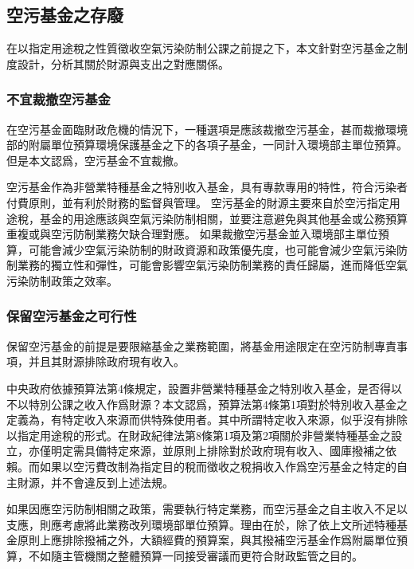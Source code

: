 \documentclass[12pt,a4paper]{article}
\begin{document}


\subsection{空污基金之存廢}

在以指定用途稅之性質徵收空氣污染防制公課之前提之下，本文針對空污基金之制度設計，分析其關於財源與支出之對應關係。

\subsubsection{不宜裁撤空污基金}

在空污基金面臨財政危機的情況下，一種選項是應該裁撤空污基金，甚而裁撤環境部的附屬單位預算環境保護基金之下的各項子基金，一同計入環境部主單位預算。但是本文認爲，空污基金不宜裁撤。

空污基金作為非營業特種基金之特別收入基金，具有專款專用的特性，符合污染者付費原則，並有利於財務的監督與管理。
空污基金的財源主要來自於空污指定用途稅，基金的用途應該與空氣污染防制相關，並要注意避免與其他基金或公務預算重複或與空污防制業務欠缺合理對應。
如果裁撤空污基金並入環境部主單位預算，可能會減少空氣污染防制的財政資源和政策優先度，也可能會減少空氣污染防制業務的獨立性和彈性，可能會影響空氣污染防制業務的責任歸屬，進而降低空氣污染防制政策之效率。


\subsubsection{保留空污基金之可行性}

保留空污基金的前提是要限縮基金之業務範圍，將基金用途限定在空污防制專責事項，并且其財源排除政府現有收入。

中央政府依據預算法第4條規定，設置非營業特種基金之特別收入基金，是否得以不以特別公課之收入作爲財源？本文認爲，預算法第4條第1項對於特別收入基金之定義為，有特定收入來源而供特殊使用者。其中所謂特定收入來源，似乎沒有排除以指定用途稅的形式。在財政紀律法第8條第1項及第2項關於非營業特種基金之設立，亦僅明定需具備特定來源，並原則上排除對於政府現有收入、國庫撥補之依賴。而如果以空污費改制為指定目的稅而徵收之稅捐收入作爲空污基金之特定的自主財源，并不會違反到上述法規。

如果因應空污防制相關之政策，需要執行特定業務，而空污基金之自主收入不足以支應，則應考慮將此業務改列環境部單位預算。理由在於，除了依上文所述特種基金原則上應排除撥補之外，大額經費的預算案，與其撥補空污基金作爲附屬單位預算，不如隨主管機關之整體預算一同接受審議而更符合財政監管之目的。
\end{document}
